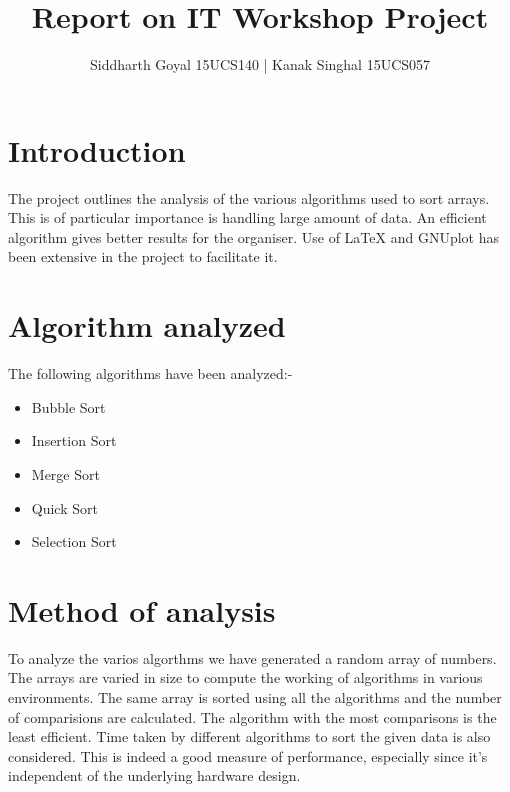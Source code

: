 \documentclass{IEEEtran}
\author{Siddharth Goyal 15UCS140 | Kanak Singhal 15UCS057}
\title{Report on IT Workshop Project}
\begin{document}
\maketitle


\section{Introduction}
\label{sec:intro}
The project outlines the analysis of the various algorithms used to sort arrays. This is of particular importance is handling large amount of data. An efficient algorithm gives better results for the organiser. Use of LaTeX and GNUplot has been extensive in the project to facilitate it.

\section{Algorithm analyzed}
\label{sec:algo}

The following algorithms have been analyzed:-
\begin{itemize}
\item Bubble Sort
\item Insertion Sort
\item Merge Sort
\item Quick Sort
\item Selection Sort
\end{itemize}

\section{Method of analysis}
\label{sec: method}
To analyze the varios algorthms we have generated a random array of numbers. The arrays are varied in size to compute the working of algorithms in various environments. The same array is sorted using all the algorithms and the number of comparisions are calculated. The algorithm with the most comparisons is the least efficient. Time taken by different algorithms to sort the given data is also considered.
This is indeed a good measure of performance, especially since it’s independent of the underlying hardware design.
\end{document}
